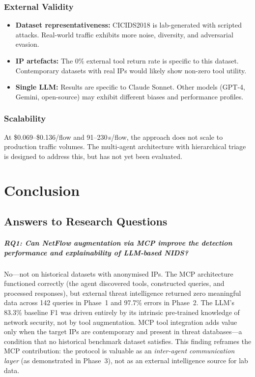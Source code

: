 \documentclass[12pt, a4paper, oneside]{report}
\begin{document}
\subsection{External Validity}

\begin{itemize}
  \item \textbf{Dataset representativeness:} CICIDS2018 is lab-generated with
        scripted attacks. Real-world traffic exhibits more noise, diversity,
        and adversarial evasion.

  \item \textbf{IP artefacts:} The 0\% external tool return rate is specific
        to this dataset. Contemporary datasets with real IPs would likely
        show non-zero tool utility.

  \item \textbf{Single LLM:} Results are specific to Claude Sonnet. Other
        models (GPT-4, Gemini, open-source) may exhibit different biases
        and performance profiles.
\end{itemize}

\subsection{Scalability}

At \$0.069--\$0.136/flow and 91--230\,s/flow, the approach does not scale
to production traffic volumes. The multi-agent architecture with hierarchical
triage is designed to address this, but has not yet been evaluated.


\chapter{Conclusion}
\label{ch:conclusion}

\section{Answers to Research Questions}

\paragraph{RQ1: Can NetFlow augmentation via MCP improve the detection performance
and explainability of LLM-based NIDS?}
No---not on historical datasets with anonymised IPs. The MCP architecture functioned
correctly (the agent discovered tools, constructed queries, and processed responses),
but external threat intelligence returned zero meaningful data across 142 queries
in Phase~1 and 97.7\% errors in Phase~2. The LLM's 83.3\% baseline F1 was driven
entirely by its intrinsic pre-trained knowledge of network security, not by tool
augmentation. MCP tool integration adds value only when the target IPs are
contemporary and present in threat databases---a condition that no historical
benchmark dataset satisfies. This finding reframes the MCP contribution: the
protocol is valuable as an \emph{inter-agent communication layer} (as demonstrated
in Phase~3), not as an external intelligence source for lab data.
\end{document}
